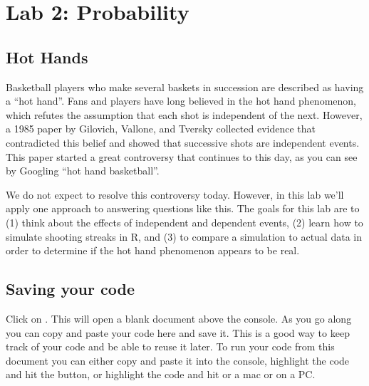\documentclass[11pt]{article}
\begin{document}
\section*{Lab 2: Probability}


%

\subsection*{Hot Hands}
Basketball players who make several baskets in succession are described as having a ``hot hand''. Fans and players have long believed in the hot hand phenomenon, which refutes the assumption that each shot is independent of the next. However, a 1985 paper by Gilovich, Vallone, and Tversky collected evidence that contradicted this belief and showed that successive shots are independent events. This paper started a great controversy that continues to this day, as you can see by Googling ``hot hand basketball''.

We do not expect to resolve this controversy today. However, in this lab we'll apply one approach to answering questions like this. The goals for this lab are to (1) think about the effects of independent and dependent events, (2) learn how to simulate shooting streaks in R, and (3) to compare a simulation to actual data in order to determine if the hot hand phenomenon appears to be real.

%

\subsection*{Saving your code}
Click on . This will open a blank document above the console. As you go along you can copy and paste your code here and save it. This is a good way to keep track of your code and be able to reuse it later. To run your code from this document you can either copy and paste it into the console, highlight the code and hit the  button, or highlight the code and hit  or a mac or  on a PC.
\end{document}
